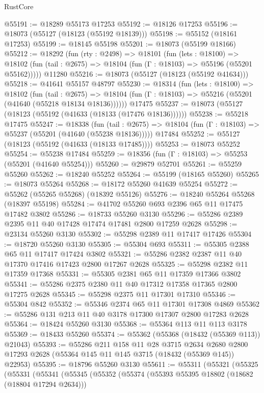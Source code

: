 \begin{lexlean}{RustCore}
\begin{coremodule}
@55191 := @18289 @55173 @17253
@55192 := @18126 @17253
@55196 := @18073 (@55127 (@18123 (@55192 @18139)))
@55198 := @55152 (@18161 @17253)
@55199 := @18145 @55198
@55201 := @18073 (@55199 @18166)
@55212 := @18292
    (fun (rty : @2498) =>
    @18101
      (fun (lets : @18100) =>
      @18102 (fun (tail : @2675) => @18104 (fun (Γ : @18103) => @55196 (@55201 @55162)))))
    @11280
@55216 := @18073 (@55127 (@18123 (@55192 @41634)))
@55218 := @41641 @55157 @48797
@55230 := @18314
    (fun (lets : @18100) =>
    @18102
      (fun (tail : @2675) =>
      @18104 (fun (Γ : @18103) => @55216 (@55201 (@41640 (@55218 @18134 @18136))))))
    @17475
@55237 := @18073 (@55127 (@18123 (@55192 (@41633 (@18133 (@17476 @18136))))))
@55238 := @55218 @17475
@55247 := @18338
    (fun (tail : @2675) => @18104 (fun (Γ : @18103) => @55237 (@55201 (@41640 (@55238 @18136)))))
    @17484
@55252 := @55127 (@18123 (@55192 (@41633 (@18133 @17485))))
@55253 := @18073 @55252
@55254 := @55238 @17484
@55259 := @18356 (fun (Γ : @18103) => @55253 (@55201 (@41640 @55254)))
@55260 := @29879 @52701
@55261 := @55259 @55260
@55262 := @18240 @55252
@55264 := @55199 (@18165 @55260)
@55265 := @18073 @55264
@55268 := @18172 @55260 @41639 @55254
@55272 := @55262 (@55265 @55268) (@18392 @55126)
@55276 := @18240 @55264 @55268 (@18397 @55198)
@55284 := @41702 @55260 @693 @2396 @65 @11 @17475 @17482 @3802
@55286 := @18733 @55260 @3130
@55296 := @55286 @2389 @2395 @11 @40 @17428 @17474 @17481 @2800 @17259 @2628
@55298 := @23134 @55260 @3130
@55302 := @55298 @2389 @11 @17417 @17426
@55304 := @18720 @55260 @3130
@55305 := @55304 @693
@55311 := @55305 @2388 @65 @11 @17417 @17424 @3802
@55321 := @55286 @2382 @2387 @11 @40 @17370 @17416 @17423 @2800 @17267 @2628
@55325 := @55298 @2382 @11 @17359 @17368
@55331 := @55305 @2381 @65 @11 @17359 @17366 @3802
@55341 := @55286 @2375 @2380 @11 @40 @17312 @17358 @17365 @2800 @17275 @2628
@55345 := @55298 @2375 @11 @17301 @17310
@55346 := @55304 @842
@55352 := @55346 @2374 @65 @11 @17301 @17308 @4869
@55362 := @55286 @131 @213 @11 @40 @3178 @17300 @17307 @2800 @17283 @2628
@55364 := @18424 @55260 @3130
@55368 := @55364 @113 @11 @113 @3178
@55369 := @18433 @55260
@55374 := @55362 (@55368 (@18432 (@55369 @113)) @21043)
@55393 := @55286
    @211
    @158
    @11
    @28
    @3715
    @2634
    @2680
    @2800
    @17293
    @2628
    (@55364 @145 @11 @145 @3715 (@18432 (@55369 @145)) @22953)
@55395 := @18796 @55260 @3130
@55611 := @55311
    (@55321
      (@55325
        (@55331
          (@55341
            (@55345
              (@55352
                (@55374
                  (@55393 @55395 @18802 (@18682 (@18804 @17294 @2634)))

\end{coremodule}
\end{lexlean}
